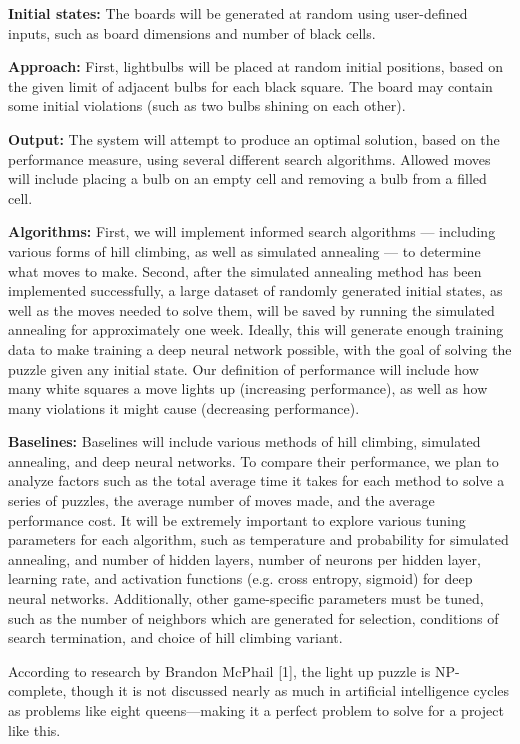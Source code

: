 \documentclass{article} %
\begin{document}
\textbf{Initial states:} The boards will be generated at random using user-defined inputs, such as board dimensions and number of black cells.

\textbf{Approach:} First, lightbulbs will be placed at random initial positions, based on the given limit of adjacent bulbs for each black square. The board may contain some initial violations (such as two bulbs shining on each other).

\textbf{Output:} The system will attempt to produce an optimal solution, based on the performance measure, using several different search algorithms. Allowed moves will include placing a bulb on an empty cell and removing a bulb from a filled cell.

\textbf{Algorithms:} First, we will implement informed search algorithms — including various forms of hill climbing, as well as simulated annealing — to determine what moves to make. Second, after the simulated annealing method has been implemented successfully, a large dataset of randomly generated initial states, as well as the moves needed to solve them, will be saved by running the simulated annealing for approximately one week. Ideally, this will generate enough training data to make training a deep neural network possible, with the goal of solving the puzzle given any initial state. Our definition of performance will include how many white squares a move lights up (increasing performance), as well as how many violations it might cause (decreasing performance).

\textbf{Baselines:} Baselines will include various methods of hill climbing, simulated annealing, and deep neural networks. To compare their performance, we plan to analyze factors such as the total average time it takes for each method to solve a series of puzzles, the average number of moves made, and the average performance cost. It will be extremely important to explore various tuning parameters for each algorithm, such as temperature and probability for simulated annealing, and number of hidden layers, number of neurons per hidden layer, learning rate, and activation functions (e.g. cross entropy, sigmoid) for deep neural networks. Additionally, other game-specific parameters must be tuned, such as the number of neighbors which are generated for selection, conditions of search termination, and choice of hill climbing variant.

According to research by Brandon McPhail [1], the light up puzzle is NP-complete, though it is not discussed nearly as much in artificial intelligence cycles as problems like eight queens—making it a perfect problem to solve for a project like this.
\end{document}
